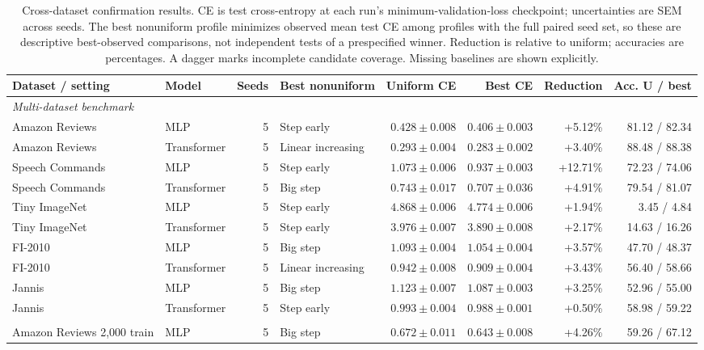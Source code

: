 \begin{table}[t]
\centering
\caption{Cross-dataset confirmation results. CE is test cross-entropy at each run's minimum-validation-loss checkpoint; uncertainties are SEM across seeds. The best nonuniform profile minimizes observed mean test CE among profiles with the full paired seed set, so these are descriptive best-observed comparisons, not independent tests of a prespecified winner. Reduction is relative to uniform; accuracies are percentages. A dagger marks incomplete candidate coverage. Missing baselines are shown explicitly.}
\label{tab:benchmark_results}
\footnotesize
\setlength{\tabcolsep}{3pt}
\begin{tabular}{@{}llrlrrrr@{}}
\toprule
Dataset / setting & Model & Seeds & Best nonuniform & Uniform CE & Best CE & Reduction & Acc. U / best \\
\midrule
\multicolumn{8}{l}{\textit{Multi-dataset benchmark}} \\
Amazon Reviews & MLP & 5 & Step early & \(0.428\pm0.008\) & \(0.406\pm0.003\) & +5.12\% & 81.12 / 82.34 \\
Amazon Reviews & Transformer & 5 & Linear increasing & \(0.293\pm0.004\) & \(0.283\pm0.002\) & +3.40\% & 88.48 / 88.38 \\
Speech Commands & MLP & 5 & Step early & \(1.073\pm0.006\) & \(0.937\pm0.003\) & +12.71\% & 72.23 / 74.06 \\
Speech Commands & Transformer & 5 & Big step & \(0.743\pm0.017\) & \(0.707\pm0.036\) & +4.91\% & 79.54 / 81.07 \\
Tiny ImageNet & MLP & 5 & Step early & \(4.868\pm0.006\) & \(4.774\pm0.006\) & +1.94\% & 3.45 / 4.84 \\
Tiny ImageNet & Transformer & 5 & Step early & \(3.976\pm0.007\) & \(3.890\pm0.008\) & +2.17\% & 14.63 / 16.26 \\
FI-2010 & MLP & 5 & Big step & \(1.093\pm0.004\) & \(1.054\pm0.004\) & +3.57\% & 47.70 / 48.37 \\
FI-2010 & Transformer & 5 & Linear increasing & \(0.942\pm0.008\) & \(0.909\pm0.004\) & +3.43\% & 56.40 / 58.66 \\
Jannis & MLP & 5 & Big step & \(1.123\pm0.007\) & \(1.087\pm0.003\) & +3.25\% & 52.96 / 55.00 \\
Jannis & Transformer & 5 & Step early & \(0.993\pm0.004\) & \(0.988\pm0.001\) & +0.50\% & 58.98 / 59.22 \\
\addlinespace[3pt]
\multicolumn{8}{l}{\textit{Data-regime comparisons}} \\
Amazon Reviews 2,000 train & MLP & 5 & Big step & \(0.672\pm0.011\) & \(0.643\pm0.008\) & +4.26\% & 59.26 / 67.12 \\

\end{tabular}
\end{table}
